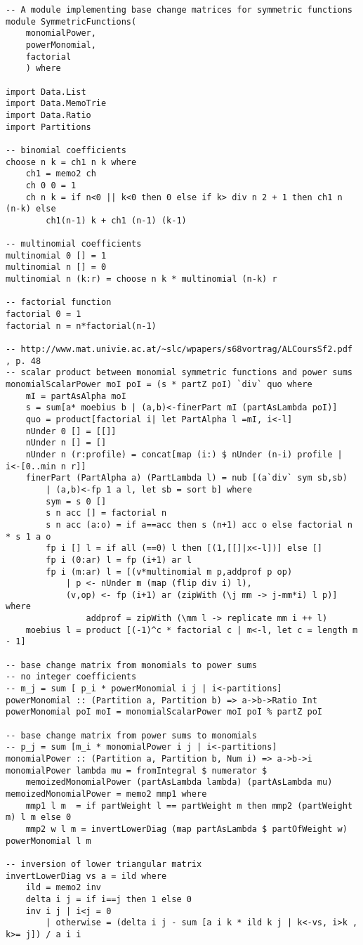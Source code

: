 \begin{lstlisting}
-- A module implementing base change matrices for symmetric functions
module SymmetricFunctions(
	monomialPower,
	powerMonomial,
	factorial
	) where

import Data.List 
import Data.MemoTrie
import Data.Ratio
import Partitions

-- binomial coefficients
choose n k = ch1 n k where
	ch1 = memo2 ch
	ch 0 0 = 1
	ch n k = if n<0 || k<0 then 0 else if k> div n 2 + 1 then ch1 n (n-k) else
		ch1(n-1) k + ch1 (n-1) (k-1)

-- multinomial coefficients
multinomial 0 [] = 1
multinomial n [] = 0
multinomial n (k:r) = choose n k * multinomial (n-k) r

-- factorial function
factorial 0 = 1
factorial n = n*factorial(n-1)

-- http://www.mat.univie.ac.at/~slc/wpapers/s68vortrag/ALCoursSf2.pdf , p. 48
-- scalar product between monomial symmetric functions and power sums
monomialScalarPower moI poI = (s * partZ poI) `div` quo where
	mI = partAsAlpha moI
	s = sum[a* moebius b | (a,b)<-finerPart mI (partAsLambda poI)]
	quo = product[factorial i| let PartAlpha l =mI, i<-l] 
	nUnder 0 [] = [[]]
	nUnder n [] = [] 
	nUnder n (r:profile) = concat[map (i:) $ nUnder (n-i) profile | i<-[0..min n r]]
	finerPart (PartAlpha a) (PartLambda l) = nub [(a`div` sym sb,sb) 
		| (a,b)<-fp 1 a l, let sb = sort b] where
		sym = s 0 []
		s n acc [] = factorial n
		s n acc (a:o) = if a==acc then s (n+1) acc o else factorial n * s 1 a o
		fp i [] l = if all (==0) l then [(1,[[]|x<-l])] else []
		fp i (0:ar) l = fp (i+1) ar l
		fp i (m:ar) l = [(v*multinomial m p,addprof p op) 
			| p <- nUnder m (map (flip div i) l), 
			(v,op) <- fp (i+1) ar (zipWith (\j mm -> j-mm*i) l p)] where
				addprof = zipWith (\mm l -> replicate mm i ++ l)
	moebius l = product [(-1)^c * factorial c | m<-l, let c = length m - 1]

-- base change matrix from monomials to power sums
-- no integer coefficients
-- m_j = sum [ p_i * powerMonomial i j | i<-partitions]
powerMonomial :: (Partition a, Partition b) => a->b->Ratio Int
powerMonomial poI moI = monomialScalarPower moI poI % partZ poI

-- base change matrix from power sums to monomials
-- p_j = sum [m_i * monomialPower i j | i<-partitions]
monomialPower :: (Partition a, Partition b, Num i) => a->b->i 
monomialPower lambda mu = fromIntegral $ numerator $ 
	memoizedMonomialPower (partAsLambda lambda) (partAsLambda mu)  
memoizedMonomialPower = memo2 mmp1 where
	mmp1 l m  = if partWeight l == partWeight m then mmp2 (partWeight m) l m else 0 
	mmp2 w l m = invertLowerDiag (map partAsLambda $ partOfWeight w) powerMonomial l m

-- inversion of lower triangular matrix
invertLowerDiag vs a = ild where
	ild = memo2 inv
	delta i j = if i==j then 1 else 0
	inv i j | i<j = 0
		| otherwise = (delta i j - sum [a i k * ild k j | k<-vs, i>k , k>= j]) / a i i
\end{lstlisting}